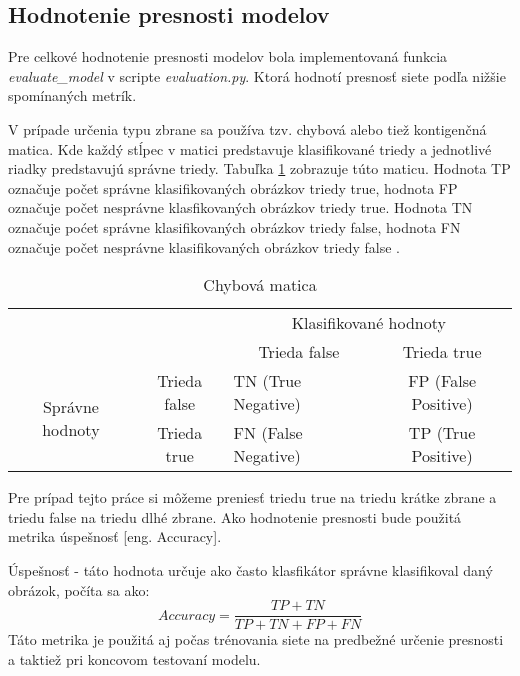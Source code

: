 \subsection{Hodnotenie presnosti modelov}
\label{subsec:hodnoteniepresnosti}
Pre celkové hodnotenie presnosti modelov bola implementovaná funkcia \textit{evaluate\_model} v scripte \textit{evaluation.py}.
Ktorá hodnotí presnosť siete podľa nižšie spomínaných metrík.

V prípade určenia typu zbrane sa používa tzv. chybová alebo tiež kontigenčná matica.
Kde každý stĺpec v matici predstavuje klasifikované triedy a jednotlivé riadky predstavujú správne triedy.
Tabuľka \ref{tab:chybovamatica} zobrazuje túto maticu.
Hodnota TP označuje počet správne klasifikovaných obrázkov triedy true, hodnota FP označuje počet nesprávne klasfikovaných obrázkov triedy true.
Hodnota TN označuje poćet správne klasifikovaných obrázkov triedy false, hodnota FN označuje počet nesprávne klasifikovaných obrázkov triedy false \cite{odkaz:ChybovaMatica}.
\begin{table}[H]
    \centering
    \label{tab:chybovamatica}
        \begin{tabular}{lllc}
                                                                &                                   & \multicolumn{2}{c}{Klasifikované hodnoty}                                           \\ \cline{3-4} 
                                                                & \multicolumn{1}{l|}{}             & \multicolumn{1}{c|}{Trieda false}        & \multicolumn{1}{c|}{Trieda true}         \\ \cline{2-4} 
        \multicolumn{1}{c|}{\multirow{2}{*}{Správne hodnoty}} & \multicolumn{1}{c|}{Trieda false} & \multicolumn{1}{l|}{TN (True Negative)}  & \multicolumn{1}{c|}{FP (False Positive)} \\ \cline{2-4} 
        \multicolumn{1}{c|}{}                                 & \multicolumn{1}{c|}{Trieda true}  & \multicolumn{1}{l|}{FN (False Negative)} & \multicolumn{1}{c|}{TP (True Positive)}  \\ \cline{2-4} 
    \end{tabular}
    \caption{Chybová matica}
\end{table}
Pre prípad tejto práce si môžeme preniesť triedu true na triedu krátke zbrane a triedu false na triedu dlhé zbrane.
Ako hodnotenie presnosti bude použitá metrika úspešnosť [eng. Accuracy].

Úspešnosť - táto hodnota určuje ako často klasfikátor správne klasifikoval daný obrázok, počíta sa ako:
\begin{equation}
    Accuracy = \frac{TP + TN}{TP + TN + FP + FN}
\end{equation}
Táto metrika je použitá aj počas trénovania siete na predbežné určenie presnosti a taktiež pri koncovom testovaní modelu.


